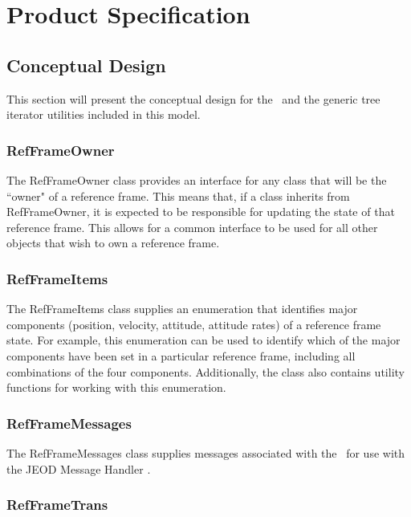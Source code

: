 \chapter{Product Specification}\label{ch:spec}

\section{Conceptual Design}

This section will present the conceptual design for the \
and the generic tree iterator utilities included in this model.

\subsection{RefFrameOwner}

The RefFrameOwner class provides an interface for any class that will be
the ``owner" of a reference frame. This means that, if a class inherits from
RefFrameOwner, it is expected to be responsible for updating the state of that
reference frame. This allows for a common interface to be used for all
other objects that wish to own a reference frame.

\subsection{RefFrameItems}

The RefFrameItems class supplies an enumeration that identifies major
components (position, velocity, attitude, attitude rates) of a reference
frame state. For example, this enumeration can be used to identify which
of the major components have been set in a particular reference frame, including
all combinations of the four components. Additionally, the class also
contains utility functions for working with this enumeration.

\subsection{RefFrameMessages}

The RefFrameMessages class supplies messages associated with the \,
for use with the JEOD Message Handler \cite{dynenv:MESSAGE}.

\subsection{RefFrameTrans}

